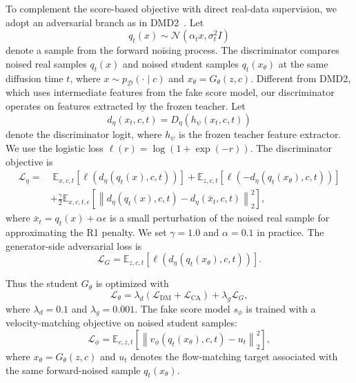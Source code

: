 To complement the score-based objective with direct real-data supervision, we adopt an adversarial branch as in DMD2~\citep{dmd2}. Let
\begin{equation*}
q_t(x) \sim \mathcal{N}(\alpha_t x, \sigma_t^2 I)
\end{equation*}
denote a sample from the forward noising process. The discriminator compares noised real samples $q_t(x)$ and noised student samples $q_t(x_\theta)$ at the same diffusion time $t$, where $x\sim p_{\mathcal{D}}(\cdot\mid c)$ and $x_\theta=G_\theta(z,c)$. Different from DMD2, which uses intermediate features from the fake score model, our discriminator operates on features extracted by the frozen teacher. Let
\begin{equation*}
d_\eta(x_t,c,t)=D_\eta(h_\psi(x_t,c,t))
\end{equation*}
denote the discriminator logit, where $h_\psi$ is the frozen teacher feature extractor. We use the logistic loss $\ell(r)=\log(1+\exp(-r))$. The discriminator objective is
\begin{equation*}
\begin{aligned}
\mathcal{L}_{\eta}
=&\;
\mathbb{E}_{x,c,t}
\left[
\ell\!\left(d_{\eta}(q_t(x),c,t)\right)
\right]
+
\mathbb{E}_{z,c,t}
\left[
\ell\!\left(-d_{\eta}(q_t(x_{\theta}),c,t)\right)
\right] \\
&+
\frac{\gamma}{2}
\mathbb{E}_{x,c,t,\epsilon}
\left[
\left\|
d_{\eta}(q_t(x),c,t)
-
d_{\eta}(\bar{x}_t,c,t)
\right\|_{2}^{2}
\right],
\end{aligned}
\end{equation*}
where $\bar{x}_t=q_t(x)+\alpha\epsilon$ is a small perturbation of the noised real sample for approximating the R1 penalty. We set $\gamma=1.0$ and $\alpha=0.1$ in practice. The generator-side adversarial loss is
\begin{equation*}
\mathcal{L}_{G}
=
\mathbb{E}_{z,c,t}
\left[
\ell\!\left(d_\eta(q_t(x_\theta),c,t)\right)
\right].
\end{equation*}

Thus the student $G_\theta$ is optimized with
\begin{equation*}
\mathcal{L}_{\theta}
=
\lambda_d
\left(
\mathcal{L}_{\mathrm{DM}}
+
\mathcal{L}_{\mathrm{CA}}
\right)
+
\lambda_g
\mathcal{L}_{G},
\end{equation*}
where $\lambda_d=0.1$ and $\lambda_g=0.001$. The fake score model $s_\phi$ is trained with a velocity-matching objective on noised student samples:
\begin{equation*}
\mathcal{L}_{\phi}
=
\mathbb{E}_{c,z,t}
\left[
\left\|
v_\phi(q_t(x_\theta),c,t)-u_t
\right\|_2^2
\right],
\end{equation*}
where $x_\theta=G_\theta(z,c)$ and $u_t$ denotes the flow-matching target associated with the same forward-noised sample $q_t(x_\theta)$.

